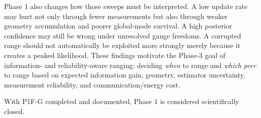 Phase 1 also changes how those sweeps must be interpreted. A low update rate may hurt not only through fewer measurements but also through weaker geometry accumulation and poorer global-mode survival. A high posterior confidence may still be wrong under unresolved gauge freedoms. A corrupted range should not automatically be exploited more strongly merely because it creates a peaked likelihood. These findings motivate the Phase-3 goal of information- and reliability-aware ranging: deciding \emph{when} to range and \emph{which peer} to range based on expected information gain, geometry, estimator uncertainty, measurement reliability, and communication/energy cost.

With P1F-G completed and documented, Phase 1 is considered scientifically closed.
